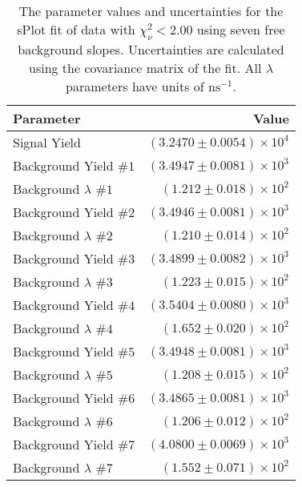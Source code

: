 
\begin{table}[ht]
    \begin{center}
        \begin{tabular}{lr}\toprule
            Parameter & Value \\\midrule
            Signal Yield & $(3.2470 \pm 0.0054) \times 10^{4}$ \\
            Background Yield $\#1$ & $(3.4947 \pm 0.0081) \times 10^{3}$ \\
            Background $\lambda$ $\#1$ & $(1.212 \pm 0.018) \times 10^{2}$ \\
            Background Yield $\#2$ & $(3.4946 \pm 0.0081) \times 10^{3}$ \\
            Background $\lambda$ $\#2$ & $(1.210 \pm 0.014) \times 10^{2}$ \\
            Background Yield $\#3$ & $(3.4899 \pm 0.0082) \times 10^{3}$ \\
            Background $\lambda$ $\#3$ & $(1.223 \pm 0.015) \times 10^{2}$ \\
            Background Yield $\#4$ & $(3.5404 \pm 0.0080) \times 10^{3}$ \\
            Background $\lambda$ $\#4$ & $(1.652 \pm 0.020) \times 10^{2}$ \\
            Background Yield $\#5$ & $(3.4948 \pm 0.0081) \times 10^{3}$ \\
            Background $\lambda$ $\#5$ & $(1.208 \pm 0.015) \times 10^{2}$ \\
            Background Yield $\#6$ & $(3.4865 \pm 0.0081) \times 10^{3}$ \\
            Background $\lambda$ $\#6$ & $(1.206 \pm 0.012) \times 10^{2}$ \\
            Background Yield $\#7$ & $(4.0800 \pm 0.0069) \times 10^{3}$ \\
            Background $\lambda$ $\#7$ & $(1.552 \pm 0.071) \times 10^{2}$ \\\bottomrule
        \end{tabular}
        \caption{The parameter values and uncertainties for the sPlot fit of data with $\chi^2_\nu < 2.00$ using seven free background slopes. Uncertainties are calculated using the covariance matrix of the fit. All $\lambda$ parameters have units of $\si{\nano\second}^{-1}$.}\label{tab:splot-fit-results-chisqdof-2.00-free-7}
    \end{center}
\end{table}
